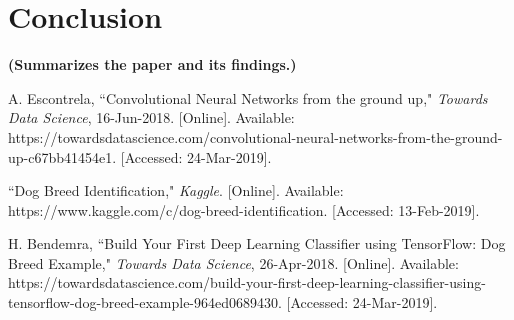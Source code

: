 \documentclass[12pt]{article}
\begin{document}
\section{Conclusion}
\textbf{(Summarizes the paper and its findings.)}


\begin{thebibliography}{9} 

A. Escontrela, ``Convolutional Neural Networks from the ground up," \textit{Towards Data Science}, 16-Jun-2018. [Online]. Available: https://towardsdatascience.com/convolutional-neural-networks-from-the-ground-up-c67bb41454e1. [Accessed: 24-Mar-2019].

``Dog Breed Identification," \textit{Kaggle}. [Online]. Available: https://www.kaggle.com/c/dog-breed-identification. [Accessed: 13-Feb-2019].

H. Bendemra, ``Build Your First Deep Learning Classifier using TensorFlow: Dog Breed Example," \textit{Towards Data Science}, 26-Apr-2018. [Online]. Available: https://towardsdatascience.com/build-your-first-deep-learning-classifier-using-tensorflow-dog-breed-example-964ed0689430. [Accessed: 24-Mar-2019].

\end{thebibliography}
\end{document}
